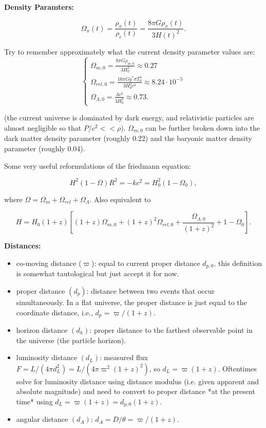 \documentclass[12pt]{article}
\newcommand{\V}{

\vspace{\baselineskip}

}
\begin{document}
\textbf{Density Paramters:}

\[\Omega_{x}(t) = \frac{\rho_{x}(t)}{\rho_{c}(t)} = \frac{8\pi G\rho_{x}(t)}{3H(t)^{2}}.\]

Try to remember approximately what the current density parameter values are:
\[\begin{cases}
\displaystyle \Omega_{m,0} =  \frac{8\pi G\rho_{m,0}}{3H_{0}^{2}} \approx 0.27 \\
\displaystyle \Omega_{rel,0} = \frac{16\pi Gg^{*}\sigma T_{0}^{4}}{3H_{0}^{2}c^{3}} \approx 8.24\cdot 10^{-5}\\
\displaystyle \Omega_{\Lambda,0} = \frac{\Lambda c^{2}}{3H_{0}^{2}} \approx 0.73.
\end{cases}
\]

(the current universe is dominated by dark energy, and relativistic particles are almost negligible so that $P/c^{2} << \rho$). $\Omega_{m,0}$ can be further broken down into the dark matter density parameter (roughly 0.22) and the baryonic matter density parameter (roughly 0.04). \V

Some very useful reformulations of the friedmann equation: 

\[H^{2}(1-\Omega)R^{2} = -kc^{2} = H_{0}^{2}(1-\Omega_{0}),\]

where $\Omega = \Omega_{m} + \Omega_{rel} + \Omega_{\Lambda}$. Also equivalent to

\[H = H_{0}(1+z)\left[(1+z)\Omega_{m,0} + (1+z)^{2}\Omega_{rel,0} + \frac{\Omega_{\Lambda,0}}{(1+z)^{2}} + 1-\Omega_{0}\right].\]\V

\textbf{Distances:}

\begin{itemize}
\item co-moving distance ($\varpi$): equal to current proper distance $d_{p,0}$. this definition is somewhat tautological but just accept it for now.
\item proper distance $(d_{p})$: distance between two events that occur simultaneously. In a flat universe, the proper distance is just equal to the coordinate distance, i.e., $d_{p} = \varpi/(1+z)$.
\item horizon distance $(d_{h})$: proper distance to the farthest observable point in the universe (the particle horizon).
\item luminosity distance $(d_{L})$: measured flux $F = L/(4\pi d_{L}^{2}) = L/(4\pi \varpi^{2} (1+z)^{2})$, so $d_{L} = \varpi (1+z)$. Oftentimes solve for luminosity distance using distance modulus (i.e. given apparent and absolute magnitude) and need to convert to proper distance *at the present time* using $d_L = \varpi (1+z) = d_{p,0} (1+z)$. 
\item angular distance $(d_{A})$: $d_{A} = D/\theta = \varpi/(1+z)$.
\end{itemize}
\end{document}
